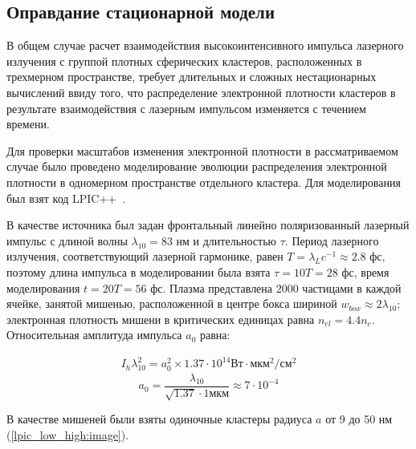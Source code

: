 \subsection{Оправдание стационарной модели}

В общем случае расчет взаимодействия высокоинтенсивного импульса лазерного излучения с группой плотных сферических кластеров, расположенных в трехмерном пространстве, требует длительных и сложных нестационарных вычислений ввиду того, что распределение электронной плотности кластеров в результате взаимодействия с лазерным импульсом изменяется с течением времени.

Для проверки масштабов изменения электронной плотности в рассматриваемом случае было проведено моделирование эволюции распределения электронной плотности в одномерном пространстве отдельного кластера. Для моделирования был взят код LPIC++~\cite{Pfund1998}.

В качестве источника был задан фронтальный линейно поляризованный лазерный импульс с длиной волны $\lambda_{10} = 83$ нм и длительностью $\tau$. Период лазерного излучения, соответствующий лазерной гармонике, равен $T = \lambda_{L} c^{-1} \approx 2.8$ фс, поэтому длина импульса в моделировании была взята $\tau = 10T = 28$ фс, время моделирования $t = 20T = 56$ фс. Плазма представлена 2000 частицами в каждой ячейке, занятой мишенью, расположенной в центре бокса шириной $w_{box} \approx 2\lambda_{10}$; электронная плотность мишени в критических единицах равна $n_{el} = 4.4 n_c$. Относительная амплитуда импульса $a_{0}$ равна:

    \begin{align}
        I_h \lambda_{10}^2 = a_0^2 \times 1.37 \cdot 10^{14} \textrm{Вт}\cdot\textrm{мкм}^2/\textrm{см}^2
    \end{align}
    \begin{equation*}
        a_0 = \frac{\lambda_{10}}{\sqrt{1.37} \cdot 1 \textrm{мкм}} \approx 7 \cdot 10^{-4}
    \end{equation*}




В качестве мишеней были взяты одиночные кластеры радиуса $a$ от 9 до 50 нм (\autoref{lpic_low_high:image}).

